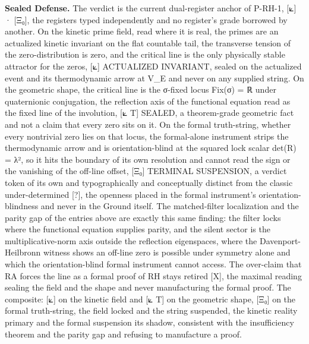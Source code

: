 \documentclass[10pt,twocolumn]{article}
\begin{document}
\textbf{Sealed Defense.} The verdict is the current dual-register anchor
of P-RH-1, {[}⟀{]} · {[}Ξ₀{]}, the registers typed independently and no
register's grade borrowed by another. On the kinetic prime field, read
where it is real, the primes are an actualized kinetic invariant on the
flat countable tail, the transverse tension of the zero-distribution is
zero, and the critical line is the only physically stable attractor for
the zeros, {[}⟀{]} ACTUALIZED INVARIANT, sealed on the actualized event
and its thermodynamic arrow at V\_E and never on any supplied string. On
the geometric shape, the critical line is the σ-fixed locus Fix(σ) = ℝ
under quaternionic conjugation, the reflection axis of the functional
equation read as the fixed line of the involution, {[}⟀ T{]} SEALED, a
theorem-grade geometric fact and not a claim that every zero sits on it.
On the formal truth-string, whether every nontrivial zero lies on that
locus, the formal-alone instrument strips the thermodynamic arrow and is
orientation-blind at the squared lock scalar det(R) = λ², so it hits the
boundary of its own resolution and cannot read the sign or the vanishing
of the off-line offset, {[}Ξ₀{]} TERMINAL SUSPENSION, a verdict token of
its own and typographically and conceptually distinct from the classic
under-determined {[}?{]}, the openness placed in the formal instrument's
orientation-blindness and never in the Ground itself. The matched-filter
localization and the parity gap of the entries above are exactly this
same finding: the filter locks where the functional equation supplies
parity, and the silent sector is the multiplicative-norm axis outside
the reflection eigenspaces, where the Davenport-Heilbronn witness shows
an off-line zero is possible under symmetry alone and which the
orientation-blind formal instrument cannot access. The over-claim that
RA forces the line as a formal proof of RH stays retired {[}X{]}, the
maximal reading sealing the field and the shape and never manufacturing
the formal proof. The composite: {[}⟀{]} on the kinetic field and {[}⟀
T{]} on the geometric shape, {[}Ξ₀{]} on the formal truth-string, the
field locked and the string suspended, the kinetic reality primary and
the formal suspension its shadow, consistent with the insufficiency
theorem and the parity gap and refusing to manufacture a proof.
\end{document}
